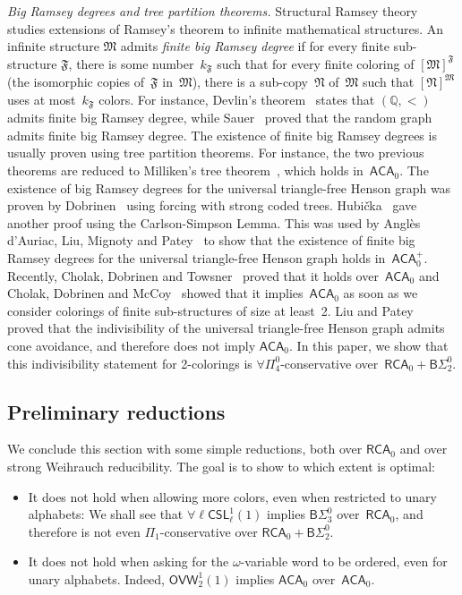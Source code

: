 \documentclass{article}
\numberwithin{theorem}{section}
\newcommand{\RCA}{\mathsf{RCA}}
\newcommand{\ACA}{\mathsf{ACA}}
\newcommand{\OVW}{\mathsf{OVW}}
\newcommand{\CSL}{\mathsf{CSL}}
\newcommand{\BSig}{\mathsf{B}\Sigma^0}
\newcommand{\QQ}{\mathbb{Q}}
\newcommand{\Mk}{\mathfrak{M}}
\newcommand{\Nk}{\mathfrak{N}}
\newcommand{\Fk}{\mathfrak{F}}
\begin{document}
\textit{Big Ramsey degrees and tree partition theorems.} Structural Ramsey theory studies extensions of Ramsey's theorem to infinite mathematical structures. An infinite structure $\Mk$ admits \emph{finite big Ramsey degree} if for every finite sub-structure $\Fk$, there is some number~$k_{\Fk}$ such that for every finite coloring of $[\Mk]^\Fk$ (the isomorphic copies of~$\Fk$ in~$\Mk$), there is a sub-copy~$\Nk$ of~$\Mk$ such that $[\Nk]^{\Mk}$ uses at most~$k_{\Fk}$ colors. For instance, Devlin's theorem~\cite{devlin1980some} states that $(\QQ, <)$ admits finite big Ramsey degree, while Sauer~\cite{sauer2006coloring} proved that the random graph admits finite big Ramsey degree. The existence of finite big Ramsey degrees is usually proven using tree partition theorems. For instance, the two previous theorems are reduced to Milliken's tree theorem~\cite{angles2020milliken}, which holds in~$\ACA_0$. The existence of big Ramsey degrees for the universal triangle-free Henson graph was proven by Dobrinen~\cite{dobrinen2020ramsey} using forcing with strong coded trees. Hubi\v{c}ka~\cite{hubivcka2020big} gave another proof using the Carlson-Simpson Lemma. This was used by Anglès d'Auriac, Liu, Mignoty and Patey~\cite{angles2023carlson} to show that the existence of finite big Ramsey degrees for the universal triangle-free Henson graph holds in~$\ACA_0^+$. Recently, Cholak, Dobrinen and Towsner~\cite{cholak2026hensonupper} proved that it holds over~$\ACA_0$ and Cholak, Dobrinen and McCoy~\cite{cholak2026henson} showed that it implies~$\ACA_0$ as soon as we consider colorings of finite sub-structures of size at least~2. Liu and Patey~\cite{liu2026reverse} proved that the indivisibility of the universal triangle-free Henson graph admits cone avoidance, and therefore does not imply $\ACA_0$. In this paper, we show that this indivisibility statement for 2-colorings is $\forall \Pi^0_4$-conservative over~$\RCA_0 + \BSig_2$.

\subsection{Preliminary reductions}

We conclude this section with some simple reductions, both over $\RCA_0$ and over strong Weihrauch reducibility. The goal is to show to which extent  is optimal: 
\begin{itemize}
    \item It does not hold when allowing more colors, even when restricted to unary alphabets: We shall see that $\forall \ell \CSL^1_\ell(1)$ implies $\BSig_3$ over~$\RCA_0$, and therefore is not even $\Pi_1$-conservative over $\RCA_0 + \BSig_2$.
    \item It does not hold when asking for the $\omega$-variable word to be ordered, even for unary alphabets. Indeed, $\OVW^1_2(1)$ implies $\ACA_0$ over~$\ACA_0$.
\end{itemize}
\end{document}
